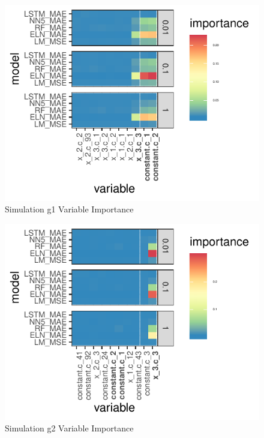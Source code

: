 \documentclass{article}
\begin{document}

\begin{figure}
	\includegraphics[]{../../Results/simulation/graphics/simulation_g1_vi.pdf}
	\caption{Simulation g1 Variable Importance}
\end{figure}

\begin{figure}
	\includegraphics[]{../../Results/simulation/graphics/simulation_g2_vi.pdf}
	\caption{Simulation g2 Variable Importance}
\end{figure}
\end{document}
